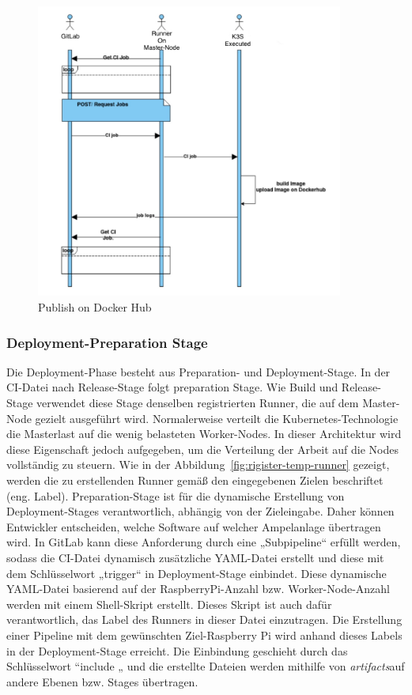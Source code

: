 \begin{figure}[bth] 
	\centering
	\includegraphics[width=0.9\textwidth]{Graphics/release.png}
	\caption{Publish on Docker Hub}
	\label{fig:release-stage}
\end{figure}


\subsubsection*{Deployment-Preparation Stage}

Die Deployment-Phase besteht aus Preparation- und Deployment-Stage. In der CI-Datei nach Release-Stage folgt preparation Stage. Wie Build und Release-Stage verwendet diese Stage denselben registrierten Runner, die auf dem Master-Node gezielt ausgeführt wird. Normalerweise verteilt die Kubernetes-Technologie die Masterlast auf die wenig belasteten Worker-Nodes. In dieser Architektur wird diese Eigenschaft jedoch aufgegeben, um die Verteilung der Arbeit auf die Nodes vollständig zu steuern. Wie in der Abbildung~\ref{fig:rigister-temp-runner} gezeigt, werden die zu erstellenden Runner gemäß den eingegebenen Zielen beschriftet (eng. Label).
\newline\newline
Preparation-Stage ist für die dynamische Erstellung von Deployment-Stages verantwortlich, abhängig von der Zieleingabe. Daher können Entwickler entscheiden, welche Software auf welcher Ampelanlage übertragen wird. In GitLab kann diese Anforderung durch eine „Subpipeline“ erfüllt werden, sodass die CI-Datei dynamisch zusätzliche YAML-Datei erstellt und diese mit dem Schlüsselwort „trigger“ in Deployment-Stage einbindet. Diese dynamische YAML-Datei basierend auf der RaspberryPi-Anzahl bzw. Worker-Node-Anzahl werden mit einem Shell-Skript erstellt. Dieses Skript ist auch dafür verantwortlich, das Label des Runners in dieser Datei einzutragen. Die Erstellung einer Pipeline mit dem gewünschten Ziel-Raspberry Pi wird anhand dieses Labels in der Deployment-Stage erreicht. Die Einbindung geschieht durch das Schlüsselwort “include „ und die erstellte Dateien werden mithilfe von \glqq \textit{artifacts}\grqq auf andere Ebenen bzw. Stages übertragen.



